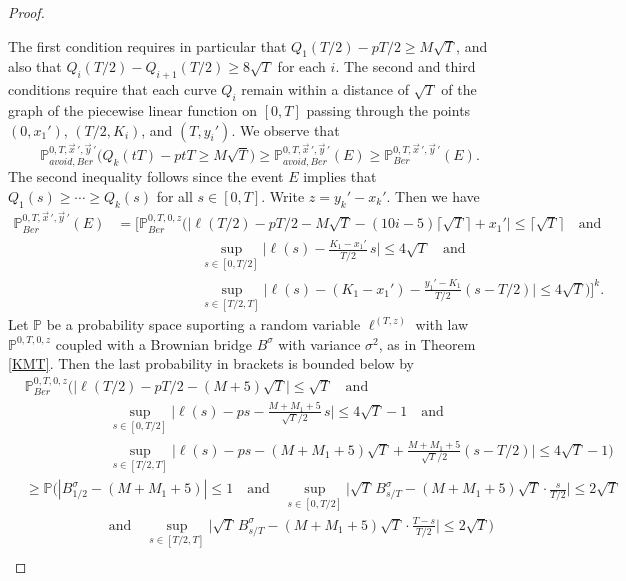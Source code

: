 \begin{proof}
\begin{enumerate}[label=(\arabic*)]
	\end{enumerate}
	The first condition requires in particular that $Q_1(T/2)-pT/2 \geq M\sqrt{T}$, and also that $Q_i(T/2)-Q_{i+1}(T/2)\geq 8\sqrt{T}$ for each $i$. The second and third conditions require that each curve $Q_i$ remain within a distance of $\sqrt{T}$ of the graph of the piecewise linear function on $[0,T]$ passing through the points $(0,x_1')$, $(T/2,K_i)$, and $(T,y_i')$. We observe that
	\[
	\mathbb{P}^{0,T,\vec{x}\,',\vec{y}\,'}_{avoid, Ber} \Big(Q_k(tT) - ptT \geq M\sqrt{T}\Big) \geq \mathbb{P}^{0,T,\vec{x}\,',\vec{y}\,'}_{avoid, Ber}(E) \geq \mathbb{P}^{0,T,\vec{x}\,',\vec{y}\,'}_{Ber}(E).
	\]
	The second inequality follows since the event $E$ implies that $Q_1(s)\geq\cdots\geq Q_k(s)$ for all $s\in[0,T]$. Write $z=y_k'-x_k'$. Then we have
	\begin{align*}
	\mathbb{P}^{0,T,\vec{x}\,',\vec{y}\,'}_{Ber}(E) &= \Big[\mathbb{P}^{0,T,0,z}_{Ber}\Big(\big|\ell(T/2)-pT/2-M\sqrt{T}-(10i-5)\lceil\sqrt{T}\rceil+x_1'\big|\leq \lceil\sqrt{T}\rceil \quad\mathrm{and}\\
	&\qquad\qquad\qquad \sup_{s\in[0,T/2]}\Big|\ell(s) - \frac{K_1-x_1'}{T/2}\,s\Big| \leq 4\sqrt{T}\quad\mathrm{and}\\
	&\qquad\qquad\qquad \sup_{s\in[T/2,T]}\Big|\ell(s)-(K_1-x_1')-\frac{y_1'-K_1}{T/2}(s-T/2)\Big| \leq 4\sqrt{T}\Big) \Big]^k.
	\end{align*}
	Let $\mathbb{P}$ be a probability space suporting a random variable $\ell^{(T,z)}$ with law $\mathbb{P}^{0,T,0,z}$ coupled with a Brownian bridge $B^\sigma$ with variance $\sigma^2$, as in Theorem \ref{KMT}. Then the last probability in brackets is bounded below by
	\begin{align*}
	& \mathbb{P}^{0,T,0,z}_{Ber}\Big(\big|\ell(T/2)-pT/2-(M+5)\sqrt{T}\big|\leq\sqrt{T}\quad\mathrm{and}\\
	&\qquad\qquad\qquad \sup_{s\in[0,T/2]}\Big|\ell(s)-ps-\frac{M+M_1+5}{\sqrt{T}/2}\,s\Big| \leq 4\sqrt{T} - 1 \quad\mathrm{and}\\
	&\qquad\qquad\qquad \sup_{s\in[T/2,T]}\Big|\ell(s)-ps-(M+M_1+5)\sqrt{T}+\frac{M+M_1+5}{\sqrt{T}/2}(s-T/2)\Big| \leq 4\sqrt{T} - 1 \Big)\\
	&\geq \mathbb{P}\Big(|B^\sigma_{1/2} - (M+M_1+5)|\leq 1 \quad\mathrm{and}\quad\sup_{s\in[0,T/2]}\Big|\sqrt{T}\,B^\sigma_{s/T}-(M+M_1+5)\sqrt{T}\cdot\frac{s}{T/2}\Big| \leq 2\sqrt{T}\\
	&\qquad\qquad\qquad \mathrm{and}\quad \sup_{s\in[T/2,T]}\Big|\sqrt{T}\,B^\sigma_{s/T}-(M+M_1+5)\sqrt{T}\cdot\frac{T-s}{T/2}\Big| \leq 2\sqrt{T} \Big)\\

\end{align*}
\end{proof}
